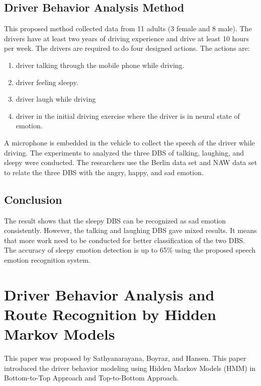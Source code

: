 \subsection{Driver Behavior Analysis Method}
This proposed method collected data from 11 adults (3 female and 8 male). The drivers have at least two years of driving experience and drive at least 10 hours per week. The drivers are required to do four designed actions. The actions are: 
\begin{enumerate}
\item driver talking through the mobile phone while driving.
\item driver feeling sleepy.
\item driver laugh while driving
\item driver in the initial driving exercise where the driver is in neural state of emotion.
\end{enumerate}

A microphone is embedded in the vehicle to collect the speech of the driver while driving. The experiments to analyzed the three DBS of talking, laughing, and sleepy were conducted. The researchers use the Berlin data set and NAW data set to relate the three DBS with the angry, happy, and sad emotion.

\subsection{Conclusion}
The result shows that the sleepy DBS can be recognized as sad emotion consistently. However, the talking and laughing DBS gave mixed results. It means that more work need to be conducted for better classification of the two DBS. The accuracy of sleepy emotion detection is up to 65\% using the proposed speech emotion recognition system.

\section{Driver Behavior Analysis and Route Recognition by Hidden Markov Models}
This paper was proposed by Sathyanarayana, Boyraz, and Hansen\citeyear{sath:2008}. This paper introduced the driver behavior modeling using Hidden Markov Models (HMM) in Bottom-to-Top Approach and Top-to-Bottom Approach.

